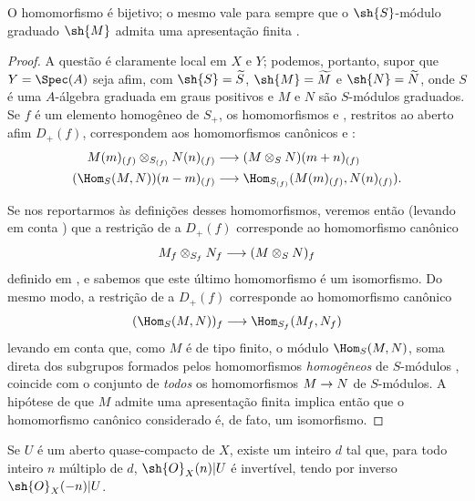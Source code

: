 \documentclass[oneside,10pt]{amsart}
\makeatletter
\newcommand{\ega@arrow}[2]{\mathchoice{#1}{#2}{#2}{#2}}
\renewcommand{\to}{\ega@arrow{\longrightarrow}{\rightarrow}}
\let\EGAOriginalLabel\label
\renewcommand{\label}[1]{\phantomsection\EGAOriginalLabel{#1}}
\makeatother
\begin{document}
\begin{proposition}[8.14.3]
\label{II.8.14.3}
O homomorfismo  é bijetivo;
o mesmo vale para  sempre que o $\sh{S}$-módulo graduado $\sh{M}$ admita uma apresentação finita .
\end{proposition}

\begin{proof}
A questão é claramente local em $X$ e $Y$;
podemos, portanto, supor que $Y=\Spec(A)$ seja afim, com $\sh{S}=\widetilde{S}$, $\sh{M}=\widetilde{M}$ e $\sh{N}=\widetilde{N}$, onde $S$ é uma $A$-álgebra graduada em graus positivos e $M$ e $N$ são $S$-módulos graduados.
Se $f$ é um elemento homogêneo de $S_+$, os homomorfismos  e , restritos ao aberto afim $D_+(f)$, correspondem aos homomorfismos canônicos  e :
\begin{align*}
    M(m)_{(f)}\otimes_{S_{(f)}}N(n)_{(f)}
    &\to
    (M\otimes_S N)(m+n)_{(f)}
\\  (\Hom_S(M,N))(n-m)_{(f)}
    &\to
    \Hom_{S_{(f)}}(M(m)_{(f)},N(n)_{(f)}).
\end{align*}

Se nos reportarmos às definições desses homomorfismos, veremos então (levando em conta ) que a restrição de  a $D_+(f)$ corresponde ao homomorfismo canônico
\[
    M_f\otimes_{S_f}N_f \to (M\otimes_S N)_f
\]
definido em , e sabemos que este último homomorfismo é um isomorfismo.
Do mesmo modo, a restrição de  a $D_+(f)$ corresponde ao homomorfismo canônico 
\[
    (\Hom_S(M,N))_f \to \Hom_{S_f}(M_f,N_f)
\]
levando em conta que, como $M$ é de tipo finito, o módulo $\Hom_S(M,N)$, soma direta dos subgrupos formados pelos homomorfismos \emph{homogêneos} de $S$-módulos , coincide com o conjunto de \emph{todos} os homomorfismos $M\to N$ de $S$-módulos.
A hipótese de que $M$ admite uma apresentação finita implica então  que o homomorfismo canônico considerado é, de fato, um isomorfismo.
\end{proof}

\begin{proposition}[8.14.4]
\label{II.8.14.4}
Se $U$ é um aberto quase-compacto de $X$, existe um inteiro $d$ tal que, para todo inteiro $n$ múltiplo de $d$, $\sh{O}_X(n)|U$ é invertível, tendo por inverso $\sh{O}_X(-n)|U$.
\end{proposition}
\end{document}
